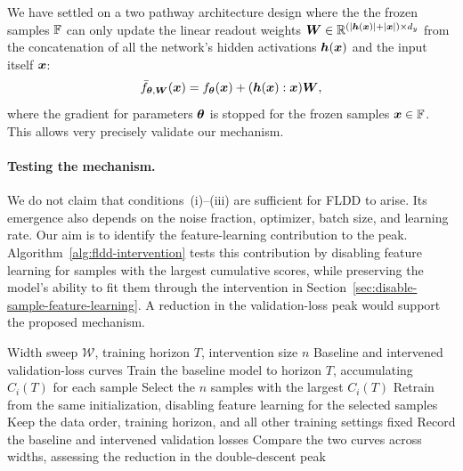 \documentclass[10pt]{article} %
\begin{document}
We have settled on a two pathway architecture design where the the frozen samples ${\mathbb{F}}$ can only update the linear readout weights ${\bm{W}} \in {\mathbb{R}}^{(\lvert {\bm{h}}({\bm{x}}) \rvert + \lvert {\bm{x}} \rvert ) \times d_y}$ from the concatenation of all the network's hidden activations ${\bm{h}}({\bm{x}})$ and the input itself ${\bm{x}}$:
\begin{equation} \label{eq:fl-ablatoion-mixed}
    \bar{f}_{{\bm{\theta}}, {\bm{W}}} ({\bm{x}}) = f_{\bm{\theta}}({\bm{x}}) + ({\bm{h}}({\bm{x}}) :  {\bm{x}}) {\bm{W}},
\end{equation}
where the gradient for parameters ${\bm{\theta}}$ is stopped for the frozen samples ${\bm{x}} \in {\mathbb{F}}$. This allows very precisely validate our mechanism.



\paragraph{Testing the mechanism.}
We do not claim that conditions~(i)--(iii) are sufficient for FLDD to arise.
Its emergence also depends on the noise fraction, optimizer, batch size,
and learning rate.
Our aim is to identify the feature-learning contribution to the peak.
Algorithm~\ref{alg:fldd-intervention} tests this contribution by disabling
feature learning for samples with the largest cumulative scores, while
preserving the model's ability to fit them through the intervention in
Section~\ref{sec:disable-sample-feature-learning}. A reduction in the
validation-loss peak would support the proposed mechanism.

\begin{algorithm}[htbp]
\caption{FLDD intervention algorithm}
\label{alg:fldd-intervention}
\begin{algorithmic}[1]
\Require Width sweep $\mathcal{W}$, training horizon $T$, intervention size $n$
\Ensure Baseline and intervened validation-loss curves
    \State Train the baseline model to horizon $T$, accumulating $C_i(T)$ for each sample
    \State Select the $n$ samples with the largest $C_i(T)$
    \State Retrain from the same initialization, disabling feature learning for the selected samples
    \State Keep the data order, training horizon, and all other training settings fixed
    \State Record the baseline and intervened validation losses
\EndFor
\State Compare the two curves across widths, assessing the reduction in the double-descent peak
\end{algorithmic}
\end{algorithm}
\end{document}
